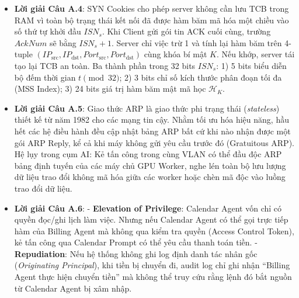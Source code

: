 \begin{itemize}
  \item \textbf{Lời giải Câu A.4}:
  SYN Cookies cho phép server không cần lưu TCB trong RAM vì toàn bộ trạng thái kết nối đã được hàm băm mã hóa một chiều vào số thứ tự khởi đầu $ISN_s$. Khi Client gửi gói tin ACK cuối cùng, trường $AckNum$ sẽ bằng $ISN_s + 1$. Server chỉ việc trừ 1 và tính lại hàm băm trên 4-tuple $(IP_{\text{src}}, IP_{\text{dst}}, Port_{\text{src}}, Port_{\text{dst}})$ cùng khóa bí mật $K$. Nếu khớp, server tái tạo lại TCB an toàn.
  Ba thành phần trong 32 bits $ISN_s$:
  1) 5 bits biểu diễn bộ đếm thời gian $t \pmod{32}$;
  2) 3 bits chỉ số kích thước phân đoạn tối đa (MSS Index);
  3) 24 bits giá trị hàm băm mật mã học $\mathcal{H}_K$.

  \item \textbf{Lời giải Câu A.5}:
  Giao thức ARP là giao thức phi trạng thái (\textit{stateless}) thiết kế từ năm 1982 cho các mạng tin cậy. Nhằm tối ưu hóa hiệu năng, hầu hết các hệ điều hành đều cập nhật bảng ARP bất cứ khi nào nhận được một gói ARP Reply, kể cả khi máy không gửi yêu cầu trước đó (Gratuitous ARP).
  Hệ lụy trong cụm AI: Kẻ tấn công trong cùng VLAN có thể đầu độc ARP bảng định tuyến của các máy chủ GPU Worker, nghe lén toàn bộ lưu lượng dữ liệu trao đổi không mã hóa giữa các worker hoặc chèn mã độc vào luồng trao đổi dữ liệu.

  \item \textbf{Lời giải Câu A.6}:
  - \textbf{Elevation of Privilege}: Calendar Agent vốn chỉ có quyền đọc/ghi lịch làm việc. Nhưng nếu Calendar Agent có thể gọi trực tiếp hàm của Billing Agent mà không qua kiểm tra quyền (Access Control Token), kẻ tấn công qua Calendar Prompt có thể yêu cầu thanh toán tiền.
  - \textbf{Repudiation}: Nếu hệ thống không ghi log định danh tác nhân gốc (\textit{Originating Principal}), khi tiền bị chuyển đi, audit log chỉ ghi nhận ``Billing Agent thực hiện chuyển tiền'' mà không thể truy cứu rằng lệnh đó bắt nguồn từ Calendar Agent bị xâm nhập.


\end{itemize}
